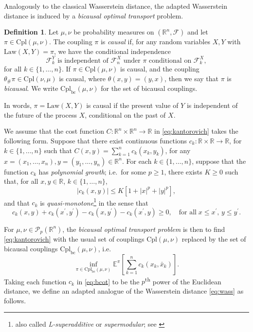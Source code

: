 \documentclass[onseside, final]{amsart}
\theoremstyle{definition}
\newtheorem{definition}[theorem]{Definition}
\newcommand{\F}{\mathcal F}
\newcommand{\Pc}{\mathcal P}
\newcommand{\R}{\mathbb R}
\newcommand{\E}{\mathbb E}
\newcommand{\Law}{\mathrm{Law}}
\newcommand{\cpl}{\mathrm{Cpl}}
\newcommand{\cplba}{\cpl_{\mathrm{bc}}}
\numberwithin{equation}{section}
\begin{document}
			Analogously to the classical Wasserstein distance, the adapted Wasserstein distance is induced by a \emph{bicausal optimal transport} problem.			
			\begin{definition}
			\label{def:bicausal}
				Let $\mu, \nu$ be probability measures on $(\R^n, \F)$ and let $\pi \in \cpl(\mu, \nu)$. The coupling $\pi$ is \emph{causal} if, for any random variables $X,Y$ with $\Law(X, Y) = \pi$, we have the conditional independence
				\begin{equation}\label{eq:causality}
					\text{$\F^Y_k$ is independent of $\F^X_n$ under $\pi$ conditional on $\F^X_k$},
				\end{equation}
				for all $k \in \{1, \dotsc, n\}$. If $\pi \in \cpl(\mu, \nu)$ is causal, and the coupling $\theta_\#\pi \in \cpl(\nu, \mu)$ is causal, where $\theta(x, y) = (y, x)$, then we say that $\pi$ is \emph{bicausal}. We write $\cplba(\mu, \nu)$ for the set of bicausal couplings.
			\end{definition}
			
			In words, $\pi = \Law(X, Y)$ is causal if the present value of $Y$ is independent of the future of the process $X$, conditional on the past of $X$.
			
			We assume that the cost function $C \colon \R^n \times \R^n \to \R$ in \eqref{eq:kantorovich} takes the following form. Suppose that there exist continuous functions $c_k \colon \R \times \R \to \R$, for $k \in \{1, \dotsc, n\}$ such that $C(x, y) = \sum_{k = 1}^n c_k(x_k, y_k)$, for any $x = (x_1, \dotsc, x_n), y = (y_1, \dotsc, y_n) \in \R^n$. For each $k \in \{1, \dotsc, n\}$, suppose that the function $c_k$ has \emph{polynomial growth}; i.e.~for some $p \geq 1$, there exists $K \geq 0$ such that, for all $x, y \in \R$, $k \in \{1, \dotsc, n\}$,
			\begin{equation}\label{eq:poly-growth}
				|c_k(x,y)|\leq K[1+|x|^p+|y|^p],
			\end{equation}
			and that $c_k$ is \emph{quasi-monotone}\footnote{also called \emph{L-superadditive} or \emph{supermodular}; see \citet[Remark 1.1]{BlGrSa89}} in the sense that
			\begin{equation}\label{eq:superadditivity}
				c_k(x, y) + c_k(x^\prime, y^\prime) - c_k(x, y^\prime) - c_k(x^\prime, y) \geq 0, \quad \text{for all} \; x \leq x^\prime, \, y \leq y^\prime.
			\end{equation}
			
			For $\mu, \nu \in \Pc_p(\R^n)$, the \emph{bicausal optimal transport problem} is then to find \eqref{eq:kantorovich} with the usual set of couplings $\cpl(\mu, \nu)$ replaced by the set of bicausal couplings $\cplba(\mu, \nu)$, i.e.
				\begin{equation}\label{eq:bcot}
					\inf_{\pi \in \cplba(\mu, \nu)}\E^\pi\!\left[\sum_{k = 1}^n c_k(x_k, \bar x_k)\right]\!.
				\end{equation}
			Taking each function $c_k$ in \eqref{eq:bcot} to be the $p$\textsuperscript{th} power of the Euclidean distance, we define an adapted analogue of the Wasserstein distance \eqref{eq:wass} as follows.
			
\end{document}
